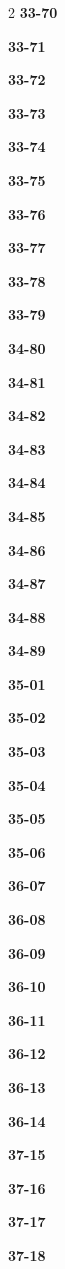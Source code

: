 \documentclass[10pt,a4paper]{article}
\begin{document}
\begin{multicols}{2}
\noindent\textbf{33-70}\ \par
\noindent\textbf{33-71}\ \par
\noindent\textbf{33-72}\ \par
\noindent\textbf{33-73}\ \par
\noindent\textbf{33-74}\ \par
\noindent\textbf{33-75}\ \par
\noindent\textbf{33-76}\ \par
\noindent\textbf{33-77}\ \par
\noindent\textbf{33-78}\ \par
\noindent\textbf{33-79}\ \par
\noindent\textbf{34-80}\ \par
\noindent\textbf{34-81}\ \par
\noindent\textbf{34-82}\ \par
\noindent\textbf{34-83}\ \par
\noindent\textbf{34-84}\ \par
\noindent\textbf{34-85}\ \par
\noindent\textbf{34-86}\ \par
\noindent\textbf{34-87}\ \par
\noindent\textbf{34-88}\ \par
\noindent\textbf{34-89}\ \par
\noindent\textbf{35-01}\ \par
\noindent\textbf{35-02}\ \par
\noindent\textbf{35-03}\ \par
\noindent\textbf{35-04}\ \par
\noindent\textbf{35-05}\ \par
\noindent\textbf{35-06}\ \par
\noindent\textbf{36-07}\ \par
\noindent\textbf{36-08}\ \par
\noindent\textbf{36-09}\ \par
\noindent\textbf{36-10}\ \par
\noindent\textbf{36-11}\ \par
\noindent\textbf{36-12}\ \par
\noindent\textbf{36-13}\ \par
\noindent\textbf{36-14}\ \par
\noindent\textbf{37-15}\ \par
\noindent\textbf{37-16}\ \par
\noindent\textbf{37-17}\ \par
\noindent\textbf{37-18}\ \par

\end{multicols}
\end{document}
